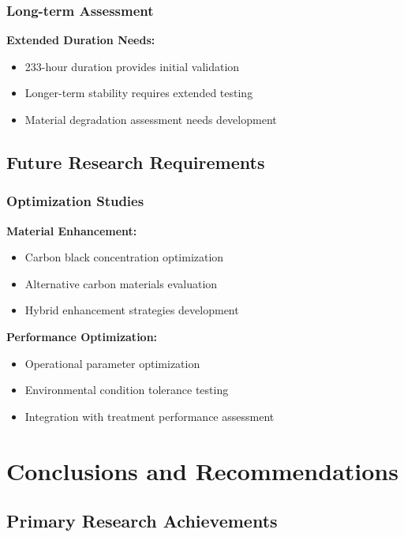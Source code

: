 \documentclass[12pt,a4paper]{article}
\begin{document}
\subsubsection{Long-term Assessment}

\textbf{Extended Duration Needs:}
\begin{itemize}
    \item 233-hour duration provides initial validation
    \item Longer-term stability requires extended testing
    \item Material degradation assessment needs development
\end{itemize}

\subsection{Future Research Requirements}

\subsubsection{Optimization Studies}

\textbf{Material Enhancement:}
\begin{itemize}
    \item Carbon black concentration optimization
    \item Alternative carbon materials evaluation
    \item Hybrid enhancement strategies development
\end{itemize}

\textbf{Performance Optimization:}
\begin{itemize}
    \item Operational parameter optimization
    \item Environmental condition tolerance testing
    \item Integration with treatment performance assessment
\end{itemize}

\section{Conclusions and Recommendations}

\subsection{Primary Research Achievements}
\end{document}
